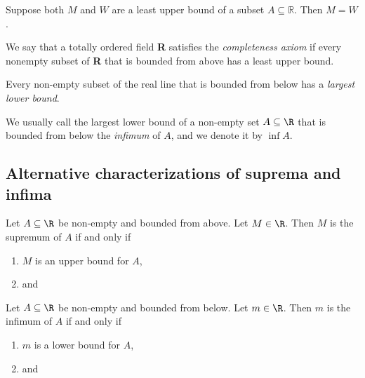 \begin{proposition}
    Suppose both $M$ and $W$ are a least upper bound of a subset $A \subseteq \mathbb{R}$. Then $M = W$.
\end{proposition}

\begin{axiom}
    We say that a totally ordered field \textbf{R} satisfies the \emph{completeness axiom} if every nonempty subset of \textbf{R} that is bounded from above has a least upper bound.
\end{axiom}

\begin{lemma}
    Every non-empty subset of the real line that is bounded from below has a \emph{largest lower bound}.
\end{lemma}

\begin{definition}[infimum]
    We usually call the largest lower bound of a non-empty set $A \subseteq \R$ that is bounded from below the \emph{infimum} of $A$, and we denote it by $\inf A$.
\end{definition}

\subsection{Alternative characterizations of suprema and infima}
\begin{proposition}
    Let $A \subseteq \R$ be non-empty and bounded from above. Let $M \in \R$. Then $M$ is the supremum of $A$ if and only if
    \begin{enumerate}
        \item $M$ is an upper bound for $A$,
        \item and 
            \begin{myCenter}
            \end{myCenter}
    \end{enumerate}
\end{proposition}

\begin{proposition}
    Let $A \subseteq \R$ be non-empty and bounded from below. Let $m \in \R$. Then $m$ is the infimum of $A$ if and only if
    \begin{enumerate}
        \item $m$ is a lower bound for $A$,
        \item and 
            \begin{myCenter}
            \end{myCenter}
    \end{enumerate}
\end{proposition}

